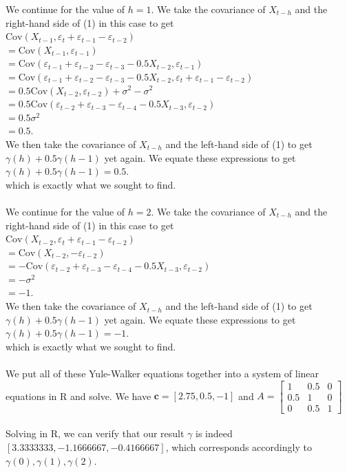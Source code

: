 \documentclass{article}
\begin{document}
{We continue for the value of $h=1$. We take the covariance of $X_{t-h}$ and the right-hand side of (1) in this case to get \\ $\text{Cov}(X_{t-1}, \varepsilon_t + \varepsilon_{t-1} - \varepsilon_{t-2})$ \\ 
$= \text{Cov}(X_{t-1}, \varepsilon_{t-1})$ \\ 
$= \text{Cov}(\varepsilon_{t-1} + \varepsilon_{t-2} - \varepsilon_{t-3} - 0.5X_{t-2}, \varepsilon_{t-1})$ \\
$= \text{Cov}(\varepsilon_{t-1} + \varepsilon_{t-2} - \varepsilon_{t-3} - 0.5X_{t-2}, \varepsilon_{t} + \varepsilon_{t-1} - \varepsilon_{t-2})$ \\
$= 0.5\text{Cov}(X_{t-2}, \varepsilon_{t-2}) + \sigma^2 - \sigma^2$ \\
$= 0.5\text{Cov}(\varepsilon_{t-2} + \varepsilon_{t-3} - \varepsilon_{t-4} - 0.5X_{t-3}, \varepsilon_{t-2})$ \\
$= 0.5\sigma^2$ \\
$= 0.5$. \\
We then take the covariance of $X_{t-h}$ and the left-hand side of (1) to get $\gamma(h) + 0.5\gamma(h-1)$ yet again. We equate these expressions to get \\
$\gamma(h) + 0.5\gamma(h-1) = 0.5.$ \\
which is exactly what we sought to find. \\ \\
We continue for the value of $h=2$. We take the covariance of $X_{t-h}$ and the right-hand side of (1) in this case to get \\ $\text{Cov}(X_{t-2}, \varepsilon_t + \varepsilon_{t-1} - \varepsilon_{t-2})$ \\ 
$= \text{Cov}(X_{t-2}, -\varepsilon_{t-2})$ \\ 
$= -\text{Cov}(\varepsilon_{t-2} + \varepsilon_{t-3} - \varepsilon_{t-4} - 0.5X_{t-3}, \varepsilon_{t-2})$ \\
$= -\sigma^2$ \\
$= -1$. \\
We then take the covariance of $X_{t-h}$ and the left-hand side of (1) to get $\gamma(h) + 0.5\gamma(h-1)$ yet again. We equate these expressions to get \\
$\gamma(h) + 0.5\gamma(h-1) = -1.$ \\
which is exactly what we sought to find. \\ \\
We put all of these Yule-Walker equations together into a system of linear equations in R and solve. We have $\textbf{c} = [2.75, 0.5, -1]$ and $A = \begin{bmatrix}
  1 & 0.5 & 0 \\
  0.5 & 1 & 0 \\
  0 & 0.5 & 1
  \end{bmatrix}$ \\ \\
Solving in R, we can verify that our result $\gamma$ is indeed $[3.3333333, -1.1666667, -0.4166667]$, which corresponds accordingly to $\gamma(0), \gamma(1), \gamma(2)$.

}
\end{document}

